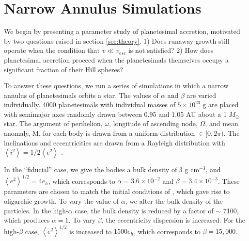 \documentclass[twocolumn]{aastex63}
\begin{document}
\section{Narrow Annulus Simulations}\label{sec:narrow}

We begin by presenting a parameter study of planetesimal accretion,
motivated by two questions raised in section \ref{sec:theory}. 1) Does
runaway growth still operate when the condition that $v \ll v_{esc}$
is not satisfied? 2) How does planetesimal accretion proceed when the planetesimals themselves occupy a significant fraction of their Hill spheres?

To answer these questions, we run a series of simulations in which a
narrow annulus of planetesimals orbits a star. The values of $\alpha$
and $\beta$ are varied individually. 4000 planetesimals with
individual masses of $5 \times 10^{23}$ g are placed with semimajor
axes randomly drawn between 0.95 and 1.05 AU about a 1 $M_{\odot}$
star. The argument of perihelion, $\omega$, longitude of ascending node,
$\Omega$, and mean anomaly, M, for each body is drawn from a uniform
distribution $\in [0, 2 \pi)$. The inclinations and eccentricities are drawn
from a Rayleigh distribution with
$\left< i^{2} \right> = 1/2 \left< e^{2} \right>$ \citep{ida93a}.

In the ``fiducial'' case, we give the bodies a bulk density of 3 g
cm$^{-3}$, and $\left< e^{2} \right>^{1/2} = 4 e_{h}$, which corresponds to $\alpha = 3.6 \times 10^{-2}$ and $\beta = 3.4 \times 10^{-3}$. These parameters are chosen to match the initial conditions of \citet{kokubo98}, which gave rise to oligarchic growth. To vary the value of $\alpha$, we alter the bulk density of the particles. In the high-$\alpha$ case, the bulk density is reduced by a factor of $\sim$ 7100, which produces $\alpha = 1$. To vary $\beta$, the eccentricity dispersion is increased. For the high-$\beta$ case, $\left< e^{2} \right>^{1/2}$ is increased to $1500 e_{h}$, which corresponds to $\beta = 15,000$.
\end{document}
